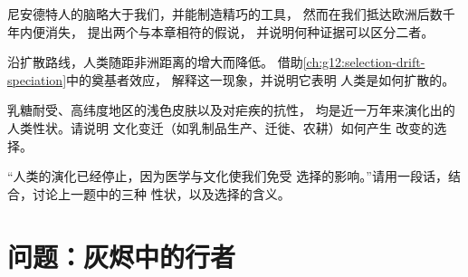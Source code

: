 \begin{exercise}[$\star\star\star$]\label{exo:g12:human-evolution:12}
尼安德特人的脑略大于我们，并能制造精巧的工具，
然而在我们抵达欧洲后数千年内便消失，
提出两个与本章相符的假说，
并说明何种证据可以区分二者。
\end{exercise}

\begin{exercise}[$\star\star\star$]\label{exo:g12:human-evolution:13}
沿扩散路线，人类随距非洲距离的增大而降低。
借助\cref{ch:g12:selection-drift-speciation}中的奠基者效应，
解释这一现象，并说明它表明
人类是如何扩散的。
\end{exercise}

\begin{exercise}[$\star\star\star$]\label{exo:g12:human-evolution:14}
乳糖耐受、高纬度地区的浅色皮肤以及对疟疾的抗性，
均是近一万年来演化出的人类性状。请说明
文化变迁（如乳制品生产、迁徙、农耕）如何产生
改变的选择。
\end{exercise}

\begin{exercise}[$\star\star\star$]\label{exo:g12:human-evolution:15}
“人类的演化已经停止，因为医学与文化使我们免受
选择的影响。”请用一段话，结合，讨论上一题中的三种
性状，以及选择的含义。
\end{exercise}

\section{问题：灰烬中的行者}

